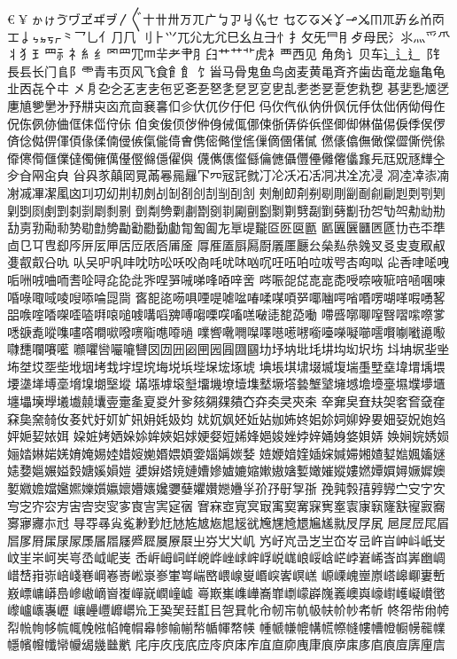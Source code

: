 €¥〿ゕゖゔヷヹヸヺ〳〴〵〸〹〺ㄪㄫㄬㆠㆡㆢㆣㆤ
ㆥㆦㆧㆨㆩㆪㆫㆬㆭㆮㆯㆰㆱㆲㆳㆴㆵㆶㆷ⺀⺂⺃⺅⺆⺇
⺉⺊⺍⺎⺏⺐⺑⺒⺓⺔⺕⺖⺘⺙⺛⺜⺝⺞⺟⺠⺡⺢⺣⺤⺥
⺦⺨⺩⺫⺬⺭⺯⺰⺱⺲⺴⺵⺸⺹⺺⺼⺽⺾⺿⻀⻁⻂⻃⻄⻅
⻆⻇⻈⻉⻋⻌⻍⻎⻏⻐⻑⻒⻓⻔⻕⻖⻗⻘⻙⻚⻛⻜⻝⻞⻟
⻠⻡⻢⻣⻤⻥⻦⻧⻨⻩⻪⻫⻬⻭⻮⻯⻰⻱⻲⻳㐀㐁㐂㐃㐄
㐅㐆㐇㐈㐉㐊㐋㐌㐍㐎㐏㐐㐑㐒㐓㐔㐕㐖㐗㐘㐙㐚㐛㐜㐝
㐞㐟㐠㐡㐢㐣㐤㐥㐦㐧㐨㐩㐪㐫㐬㐭㐮㐯㐰㐱㐲㐳㐴㐵㐶
㐷㐸㐹㐺㐻㐼㐽㐾㐿㑀㑁㑂㑃㑄㑅㑆㑈㑉㑊㑋㑌㑍㑎㑏㑐
㑑㑒㑓㑔㑕㑖㑗㑘㑙㑚㑛㑜㑝㑞㑟㑠㑡㑢㑣㑤㑥㑦㑧㑨㑩
㑪㑫㑬㑭㑮㑯㑰㑱㑲㑴㑵㑶㑷㑸㑹㑺㑻㑼㑽㑾㑿㒀㒁㒂㒃
㒄㒅㒆㒇㒈㒉㒊㒋㒌㒍㒎㒏㒐㒑㒒㒓㒔㒕㒖㒗㒘㒙㒚㒛㒜
㒝㒞㒟㒠㒡㒢㒣㒤㒥㒦㒧㒨㒩㒪㒫㒬㒭㒮㒯㒰㒱㒲㒳㒴㒵
㒶㒷㒸㒹㒺㒻㒼㒽㒾㒿㓀㓁㓂㓃㓄㓅㓆㓇㓈㓉㓊㓋㓌㓍㓎
㓏㓐㓑㓒㓓㓔㓕㓖㓗㓘㓙㓚㓛㓜㓝㓞㓟㓠㓡㓢㓣㓤㓥㓦㓧
㓨㓩㓪㓫㓬㓭㓮㓯㓰㓱㓲㓳㓴㓵㓶㓷㓸㓹㓺㓻㓼㓽㓾㓿㔀
㔁㔂㔃㔄㔅㔆㔇㔈㔉㔊㔋㔌㔍㔎㔏㔐㔑㔒㔓㔔㔕㔖㔗㔘㔙
㔚㔛㔜㔝㔞㔟㔠㔡㔢㔣㔤㔥㔦㔧㔨㔩㔪㔫㔬㔭㔮㔯㔰㔱㔲
㔳㔴㔵㔶㔷㔸㔹㔺㔻㔼㔽㔾㔿㕀㕁㕂㕃㕄㕅㕆㕇㕈㕉㕊㕋
㕌㕍㕎㕏㕐㕑㕒㕓㕔㕕㕖㕗㕘㕙㕚㕛㕜㕝㕞㕟㕠㕡㕢㕣㕤
㕥㕦㕧㕨㕩㕪㕫㕬㕭㕮㕯㕰㕱㕲㕳㕴㕵㕶㕷㕸㕹㕺㕻㕼㕽
㕾㕿㖀㖁㖂㖃㖄㖅㖆㖇㖈㖉㖊㖋㖌㖍㖎㖏㖐㖑㖒㖓㖔㖕㖖
㖗㖘㖙㖚㖛㖜㖝㖟㖠㖡㖢㖣㖤㖥㖦㖧㖨㖩㖪㖫㖬㖭㖮㖯㖰
㖱㖲㖳㖴㖵㖶㖷㖸㖹㖺㖻㖼㖽㖾㖿㗀㗁㗂㗃㗄㗅㗆㗇㗈㗉
㗊㗋㗌㗍㗎㗏㗐㗑㗒㗓㗔㗕㗖㗗㗘㗙㗚㗛㗜㗝㗞㗟㗠㗡㗢
㗣㗤㗥㗦㗧㗨㗩㗪㗫㗬㗭㗮㗯㗰㗱㗲㗳㗴㗵㗶㗷㗸㗹㗺㗻
㗼㗽㗾㗿㘀㘁㘂㘃㘄㘅㘆㘇㘈㘉㘊㘋㘌㘍㘏㘐㘑㘒㘓㘔㘕
㘖㘗㘘㘙㘛㘜㘝㘞㘟㘠㘡㘢㘣㘤㘥㘦㘧㘨㘩㘪㘫㘬㘭㘮㘯
㘰㘱㘲㘳㘴㘵㘶㘷㘸㘹㘺㘻㘼㘽㘾㘿㙀㙁㙂㙃㙄㙅㙆㙇㙈
㙉㙊㙋㙌㙍㙎㙏㙐㙑㙒㙓㙔㙕㙖㙗㙘㙙㙚㙛㙜㙝㙞㙟㙠㙡
㙢㙣㙤㙥㙦㙧㙨㙩㙪㙫㙬㙭㙮㙯㙰㙱㙲㙳㙴㙵㙶㙷㙸㙹㙺
㙻㙼㙽㙾㙿㚀㚁㚂㚃㚄㚅㚆㚇㚈㚉㚊㚋㚌㚍㚎㚏㚐㚑㚒㚓
㚔㚕㚖㚗㚘㚙㚚㚛㚜㚝㚞㚟㚠㚡㚢㚣㚤㚥㚦㚧㚨㚩㚪㚫㚬
㚭㚮㚯㚰㚱㚲㚳㚴㚵㚶㚷㚸㚹㚺㚻㚼㚽㚾㚿㛀㛁㛂㛃㛄㛅
㛆㛇㛈㛉㛊㛋㛌㛍㛎㛏㛐㛑㛒㛓㛔㛕㛖㛗㛘㛙㛚㛛㛜㛝㛞
㛟㛠㛡㛢㛣㛤㛥㛦㛧㛨㛩㛪㛫㛬㛭㛮㛯㛰㛱㛲㛳㛴㛵㛶㛷
㛸㛹㛺㛻㛼㛽㛾㛿㜀㜁㜂㜃㜄㜅㜆㜇㜈㜉㜊㜋㜌㜍㜎㜏㜐
㜑㜒㜓㜔㜕㜖㜗㜘㜙㜚㜛㜜㜝㜞㜟㜠㜡㜢㜣㜤㜥㜦㜧㜨㜩
㜪㜫㜬㜭㜮㜯㜰㜱㜲㜳㜴㜵㜶㜷㜸㜹㜺㜻㜼㜽㜾㜿㝀㝁㝂
㝃㝄㝅㝆㝇㝈㝉㝊㝋㝌㝍㝎㝏㝐㝑㝒㝓㝔㝕㝖㝗㝘㝙㝚㝛
㝜㝝㝞㝟㝠㝡㝢㝣㝤㝥㝦㝧㝨㝩㝪㝫㝬㝭㝮㝯㝰㝱㝲㝳㝴
㝵㝶㝷㝸㝹㝺㝻㝼㝽㝾㝿㞀㞁㞂㞃㞄㞅㞆㞇㞈㞉㞊㞋㞌㞍
㞎㞏㞐㞑㞒㞓㞔㞕㞖㞗㞘㞙㞚㞛㞜㞝㞞㞟㞠㞡㞢㞣㞤㞥㞦
㞧㞨㞩㞪㞫㞬㞭㞮㞯㞰㞱㞲㞳㞴㞵㞶㞷㞸㞹㞺㞻㞼㞽㞾㞿
㟀㟁㟂㟃㟄㟅㟆㟇㟈㟉㟊㟋㟌㟍㟎㟏㟐㟑㟒㟓㟔㟕㟖㟗㟘
㟙㟚㟛㟜㟝㟞㟟㟠㟡㟢㟣㟤㟥㟦㟧㟨㟩㟪㟫㟬㟭㟮㟯㟰㟱
㟲㟳㟴㟵㟶㟷㟸㟹㟺㟻㟼㟽㟾㟿㠀㠁㠂㠃㠄㠅㠆㠇㠈㠉㠊
㠋㠌㠍㠎㠏㠐㠑㠒㠓㠔㠕㠖㠗㠘㠙㠚㠛㠜㠝㠞㠟㠠㠡㠢㠣
㠤㠥㠦㠧㠨㠩㠪㠫㠬㠭㠮㠯㠰㠱㠲㠳㠴㠵㠶㠷㠸㠹㠺㠻㠼
㠽㠾㠿㡀㡁㡂㡃㡄㡅㡆㡇㡈㡉㡊㡋㡌㡍㡎㡏㡐㡑㡒㡓㡔㡕
㡖㡗㡘㡙㡚㡛㡜㡝㡞㡟㡠㡡㡢㡣㡤㡥㡦㡧㡨㡩㡪㡫㡬㡭㡮
㡯㡰㡱㡲㡳㡴㡵㡶㡷㡸㡹㡺㡻㡼㡽㡾㡿㢀㢁㢂㢃㢄㢅㢆㢇
